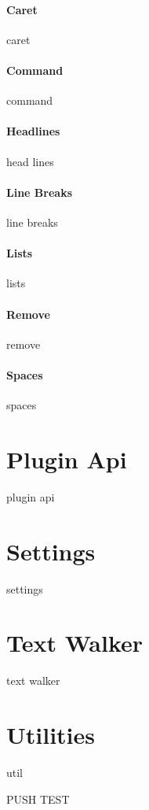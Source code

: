 \paragraph{Caret}
caret
\paragraph{Command}
command
\paragraph{Headlines}
head lines
\paragraph{Line Breaks}
line breaks
\paragraph{Lists}
lists
\paragraph{Remove}
remove
\paragraph{Spaces}
spaces

\section{Plugin Api}
plugin api
\section{Settings}
settings
\section{Text Walker}
text walker
\section{Utilities}
util


PUSH TEST